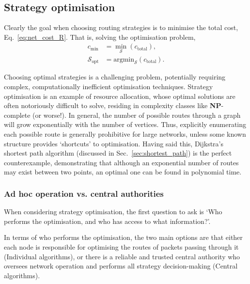 \documentclass[aps,rmp,twocolumn,amsmath,amssymb,nofootinbib,superscriptaddress]{revtex4}
\begin{document}
%
%

\subsection{Strategy optimisation} \label{sec:strat_opt}

Clearly the goal when choosing routing strategies is to minimise the total cost, Eq.~\ref{eq:net_cost_R}. That is, solving the optimisation problem,
\begin{align}
c_\mathrm{min} &= \min_\mathcal{S} (c_\mathrm{total}), \nonumber \\
\mathcal{S}_\mathrm{opt} &= \mathrm{argmin}_\mathcal{S} (c_\mathrm{total}).
\end{align}

Choosing optimal strategies is a challenging problem, potentially requiring complex, computationally inefficient optimisation techniques. Strategy optimisation is an example of resource allocation, whose optimal solutions are often notoriously difficult to solve, residing in complexity classes like \textbf{NP}-complete (or worse!). In general, the number of possible routes through a graph will grow exponentially with the number of vertices. Thus, explicitly enumerating each possible route is generally prohibitive for large networks, unless some known structure provides `shortcuts' to optimisation. Having said this, Dijkstra's shortest path algorithm (discussed in Sec.~\ref{sec:shortest_path}) is the perfect counterexample, demonstrating that although an exponential number of routes may exist between two points, an optimal one can be found in polynomial time.

%
%

\subsubsection{Ad hoc operation vs. central authorities}

When considering strategy optimisation, the first question to ask is `Who performs the optimisation, and who has access to what information?'.

In terms of who performs the optimisation, the two main options are that either each node is responsible for optimising the routes of packets passing through it ({\sc Individual} algorithms), or there is a reliable and trusted central authority who oversees network operation and performs all strategy decision-making ({\sc Central} algorithms).
\end{document}
